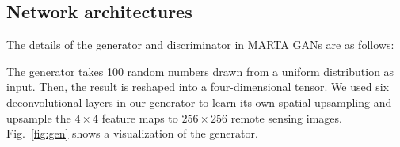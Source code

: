 \documentclass[journal]{IEEEtran}
\begin{document}
\subsection{Network architectures}
\label{subsect:net arc}



The details of the generator and discriminator in MARTA GANs are as follows:


The generator takes 100 random numbers drawn from a uniform distribution as input.
Then, the result is reshaped into a four-dimensional tensor. We used six deconvolutional layers in our generator to learn its own spatial upsampling and upsample the $4\times 4$ feature maps to $256\times256$ remote sensing images.
Fig.~\ref{fig:gen} shows a visualization of the generator.




%

\end{document}
